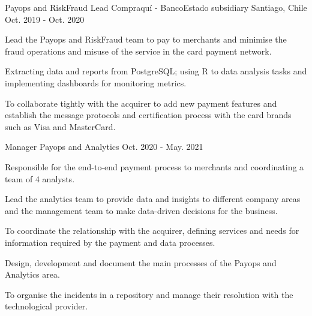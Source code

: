 

\begin{cventries}
  \cventrytwopositions
    {Payops and RiskFraud Lead}
    {Compraquí - BancoEstado subsidiary}
    {Santiago, Chile}
    {Oct. 2019 - Oct. 2020}
    {
      \begin{cvitems}
	      \item {Lead the Payops and RiskFraud team to pay to merchants and minimise the fraud operations and misuse of the service in the card payment network.}
	      \item {Extracting data and reports from PostgreSQL; using R to data analysis tasks and implementing dashboards for monitoring metrics.}
	      \item {To collaborate tightly with the acquirer to add new payment features and establish the message protocols and certification process with the card brands such as Visa and MasterCard.}
      \end{cvitems}
    }
    {Manager Payops and Analytics}
    {Oct. 2020 - May. 2021}
    {
      \begin{cvitems}
        \item {Responsible for the end-to-end payment process to merchants and coordinating a team of 4 analysts.}
        \item {Lead the analytics team to provide data and insights to different company areas and the management team to make data-driven decisions for the business.}
        \item {To coordinate the relationship with the acquirer, defining services and needs for information required by the payment and data processes.}
	\item {Design, development and document the main processes of the Payops and Analytics area.}
	\item {To organise the incidents in a repository and manage their resolution with the technological provider.}
      \end{cvitems}
    }
    

\end{cventries}
